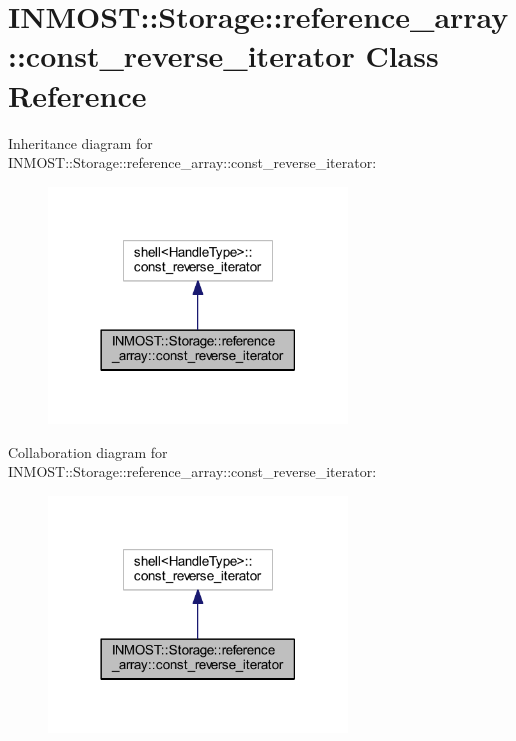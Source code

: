 \hypertarget{classINMOST_1_1Storage_1_1reference__array_1_1const__reverse__iterator}{\section{I\-N\-M\-O\-S\-T\-:\-:Storage\-:\-:reference\-\_\-array\-:\-:const\-\_\-reverse\-\_\-iterator Class Reference}
\label{classINMOST_1_1Storage_1_1reference__array_1_1const__reverse__iterator}
}


Inheritance diagram for I\-N\-M\-O\-S\-T\-:\-:Storage\-:\-:reference\-\_\-array\-:\-:const\-\_\-reverse\-\_\-iterator\-:\nopagebreak
\begin{figure}[H]
\begin{center}
\leavevmode
\includegraphics[width=225pt]{classINMOST_1_1Storage_1_1reference__array_1_1const__reverse__iterator__inherit__graph}
\end{center}
\end{figure}


Collaboration diagram for I\-N\-M\-O\-S\-T\-:\-:Storage\-:\-:reference\-\_\-array\-:\-:const\-\_\-reverse\-\_\-iterator\-:\nopagebreak
\begin{figure}[H]
\begin{center}
\leavevmode
\includegraphics[width=225pt]{classINMOST_1_1Storage_1_1reference__array_1_1const__reverse__iterator__coll__graph}
\end{center}
\end{figure}

